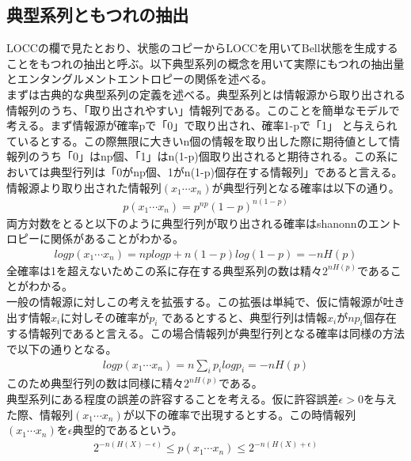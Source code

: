 \documentclass[a4paper,10.5pt]{article}
\numberwithin{equation}{section}
\begin{document}
\subsection{典型系列ともつれの抽出}
LOCCの欄で見たとおり、状態のコピーからLOCCを用いてBell状態を生成することをもつれの抽出と呼ぶ。以下典型系列の概念を用いて実際にもつれの抽出量とエンタングルメントエントロピーの関係を述べる。\\
まずは古典的な典型系列の定義を述べる。典型系列とは情報源から取り出される情報列のうち、「取り出されやすい」情報列である。このことを簡単なモデルで考える。まず情報源が確率pで「0」で取り出され、確率1-pで「1」
と与えられているとする。この際無限に大きいn個の情報を取り出した際に期待値として情報列のうち「0」はnp個、「1」はn(1-p)個取り出されると期待される。この系においては典型行列は「0がnp個、1がn(1-p)個存在する情報列」であると言える。情報源より取り出された情報列$(x_{1}\cdots x_{n})$が典型行列となる確率は以下の通り。
\begin{equation}\begin{split}
    p(x_{1}\cdots x_{n})=p^{np}(1-p)^{n(1-p)}
\end{split} \end{equation}
両方対数をとると以下のように典型行列が取り出される確率はshanonnのエントロピーに関係があることがわかる。
\begin{equation}\begin{split}
    logp(x_{1}\cdots x_{n}) =n plogp+n(1-p)log(1-p)=-nH(p)
\end{split} \end{equation}
全確率は1を超えないためこの系に存在する典型系列の数は精々$2^{nH(p)}$であることがわかる。\\
一般の情報源に対しこの考えを拡張する。この拡張は単純で、仮に情報源が吐き出す情報$x_{i}$に対しその確率が$p_{i}$
であるとすると、典型行列は情報$x_{i}$が$np_{i}$個存在する情報列であると言える。この場合情報列が典型行列となる確率は同様の方法で以下の通りとなる。
\begin{equation}\begin{split}
     logp(x_{1}\cdots x_{n}) =n \sum_{i}p_{i}logp_{i}=-nH(p) 
\end{split} \end{equation}
このため典型行列の数は同様に精々$2^{nH(p)}$である。\\
典型系列にある程度の誤差の許容することを考える。仮に許容誤差$\epsilon>0$を与えた際、情報列$(x_{1}\cdots x_{n})$が以下の確率で出現するとする。この時情報列$(x_{1}\cdots x_{n})$を$\epsilon$典型的であるという。
\begin{equation}\begin{split}
    2^{-n(H(X)-\epsilon)} \leq p(x_{1}\cdots x_{n}) \leq 2^{-n(H(X)+\epsilon)}
\end{split} \end{equation}
\end{document}
